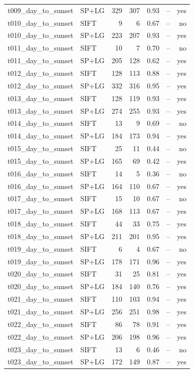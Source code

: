 \begin{longtable}{llrrrrr}
t009\_day\_to\_sunset & SP+LG & 329 & 307 & 0.93 & -- & yes \\
t010\_day\_to\_sunset & SIFT & 9 & 6 & 0.67 & -- & no \\
t010\_day\_to\_sunset & SP+LG & 223 & 207 & 0.93 & -- & yes \\
t011\_day\_to\_sunset & SIFT & 10 & 7 & 0.70 & -- & no \\
t011\_day\_to\_sunset & SP+LG & 205 & 128 & 0.62 & -- & yes \\
t012\_day\_to\_sunset & SIFT & 128 & 113 & 0.88 & -- & yes \\
t012\_day\_to\_sunset & SP+LG & 332 & 316 & 0.95 & -- & yes \\
t013\_day\_to\_sunset & SIFT & 128 & 119 & 0.93 & -- & yes \\
t013\_day\_to\_sunset & SP+LG & 274 & 255 & 0.93 & -- & yes \\
t014\_day\_to\_sunset & SIFT & 13 & 9 & 0.69 & -- & no \\
t014\_day\_to\_sunset & SP+LG & 184 & 173 & 0.94 & -- & yes \\
t015\_day\_to\_sunset & SIFT & 25 & 11 & 0.44 & -- & no \\
t015\_day\_to\_sunset & SP+LG & 165 & 69 & 0.42 & -- & yes \\
t016\_day\_to\_sunset & SIFT & 14 & 5 & 0.36 & -- & no \\
t016\_day\_to\_sunset & SP+LG & 164 & 110 & 0.67 & -- & yes \\
t017\_day\_to\_sunset & SIFT & 15 & 10 & 0.67 & -- & no \\
t017\_day\_to\_sunset & SP+LG & 168 & 113 & 0.67 & -- & yes \\
t018\_day\_to\_sunset & SIFT & 44 & 33 & 0.75 & -- & yes \\
t018\_day\_to\_sunset & SP+LG & 211 & 201 & 0.95 & -- & yes \\
t019\_day\_to\_sunset & SIFT & 6 & 4 & 0.67 & -- & no \\
t019\_day\_to\_sunset & SP+LG & 178 & 171 & 0.96 & -- & yes \\
t020\_day\_to\_sunset & SIFT & 31 & 25 & 0.81 & -- & yes \\
t020\_day\_to\_sunset & SP+LG & 184 & 140 & 0.76 & -- & yes \\
t021\_day\_to\_sunset & SIFT & 110 & 103 & 0.94 & -- & yes \\
t021\_day\_to\_sunset & SP+LG & 256 & 251 & 0.98 & -- & yes \\
t022\_day\_to\_sunset & SIFT & 86 & 78 & 0.91 & -- & yes \\
t022\_day\_to\_sunset & SP+LG & 206 & 198 & 0.96 & -- & yes \\
t023\_day\_to\_sunset & SIFT & 13 & 6 & 0.46 & -- & no \\
t023\_day\_to\_sunset & SP+LG & 172 & 149 & 0.87 & -- & yes \\
\end{longtable}\endgroup

